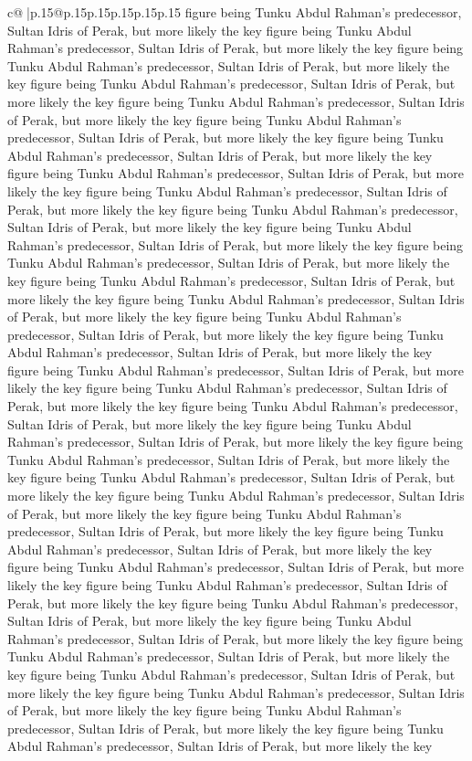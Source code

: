 \documentclass{article}
\begin{document}
{\begin{supertabular}{c@{$\;$}|p{.15\linewidth}@{}p{.15\linewidth}p{.15\linewidth}p{.15\linewidth}p{.15\linewidth}p{.15\linewidth}}
{{{figure being Tunku Abdul Rahman's predecessor, Sultan Idris of Perak, but more likely the key figure being Tunku Abdul Rahman's predecessor, Sultan Idris of Perak, but more likely the key figure being Tunku Abdul Rahman's predecessor, Sultan Idris of Perak, but more likely the key figure being Tunku Abdul Rahman's predecessor, Sultan Idris of Perak, but more likely the key figure being Tunku Abdul Rahman's predecessor, Sultan Idris of Perak, but more likely the key figure being Tunku Abdul Rahman's predecessor, Sultan Idris of Perak, but more likely the key figure being Tunku Abdul Rahman's predecessor, Sultan Idris of Perak, but more likely the key figure being Tunku Abdul Rahman's predecessor, Sultan Idris of Perak, but more likely the key figure being Tunku Abdul Rahman's predecessor, Sultan Idris of Perak, but more likely the key figure being Tunku Abdul Rahman's predecessor, Sultan Idris of Perak, but more likely the key figure being Tunku Abdul Rahman's predecessor, Sultan Idris of Perak, but more likely the key figure being Tunku Abdul Rahman's predecessor, Sultan Idris of Perak, but more likely the key figure being Tunku Abdul Rahman's predecessor, Sultan Idris of Perak, but more likely the key figure being Tunku Abdul Rahman's predecessor, Sultan Idris of Perak, but more likely the key figure being Tunku Abdul Rahman's predecessor, Sultan Idris of Perak, but more likely the key figure being Tunku Abdul Rahman's predecessor, Sultan Idris of Perak, but more likely the key figure being Tunku Abdul Rahman's predecessor, Sultan Idris of Perak, but more likely the key figure being Tunku Abdul Rahman's predecessor, Sultan Idris of Perak, but more likely the key figure being Tunku Abdul Rahman's predecessor, Sultan Idris of Perak, but more likely the key figure being Tunku Abdul Rahman's predecessor, Sultan Idris of Perak, but more likely the key figure being Tunku Abdul Rahman's predecessor, Sultan Idris of Perak, but more likely the key figure being Tunku Abdul Rahman's predecessor, Sultan Idris of Perak, but more likely the key figure being Tunku Abdul Rahman's predecessor, Sultan Idris of Perak, but more likely the key figure being Tunku Abdul Rahman's predecessor, Sultan Idris of Perak, but more likely the key figure being Tunku Abdul Rahman's predecessor, Sultan Idris of Perak, but more likely the key figure being Tunku Abdul Rahman's predecessor, Sultan Idris of Perak, but more likely the key figure being Tunku Abdul Rahman's predecessor, Sultan Idris of Perak, but more likely the key figure being Tunku Abdul Rahman's predecessor, Sultan Idris of Perak, but more likely the key figure being Tunku Abdul Rahman's predecessor, Sultan Idris of Perak, but more likely the key figure being Tunku Abdul Rahman's predecessor, Sultan Idris of Perak, but more likely the key figure being Tunku Abdul Rahman's predecessor, Sultan Idris of Perak, but more likely the key figure being Tunku Abdul Rahman's predecessor, Sultan Idris of Perak, but more likely the key figure being Tunku Abdul Rahman's predecessor, Sultan Idris of Perak, but more likely the key figure being Tunku Abdul Rahman's predecessor, Sultan Idris of Perak, but more likely the key }}}
\end{supertabular}}
\end{document}
